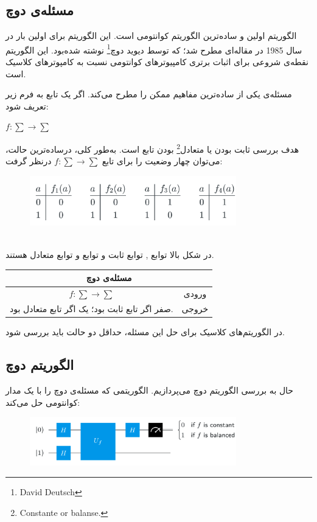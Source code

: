 \documentclass{book}
\begin{document}
\subsection{مسئله‌ی دوچ}
الگوریتم  اولین و ساده‌ترین الگوریتم کوانتومی‌ است. این الگوریتم برای اولین بار در سال 1985 در مقاله‌ای مطرح شد؛ که توسط دیوید دوچ\footnote{David Deutsch} نوشته شده‌‌بود. این الگوریتم نقطه‌ی شروعی برای اثبات برتری کامپیوترهای کوانتومی نسبت به کامپوترهای کلاسیک است.

مسئله‌ی  یکی از ساده‌ترین مفاهیم ممکن را مطرح می‌کند. اگر یک تابع به فرم زیر تعریف شود: 
\begin{center}
	$f : \sum \rightarrow \sum$
\end{center}
هدف بررسی ثابت بودن یا متعادل\footnote{Constante or balanse.} بودن تابع  است. 
به‌طور کلی، درساده‌ترین حالت، می‌توان چهار وضعیت را برای تابع $f : \sum \rightarrow \sum$ درنظر گرفت:\\
\begin{figure}[ht]
	\centering
	\includegraphics[width=0.8\textwidth]{Constantorbalanse.png}
	\caption{}
\end{figure}\\
در شکل بالا توابع  ,  توابع ثابت و توابع  و  توابع متعادل هستند.
\begin{center}
\begin{tabular}{|c|c|}
	\hline
	\multicolumn{2}{|c|}{مسئله‌ی دوچ} \\
	\hline
	$f : \sum \rightarrow \sum$ & ورودی \\
	\hline
	صفر اگر تابع ثابت بود؛ یک اگر تابع متعادل بود.  & خروجی \\
	\hline
\end{tabular}
\end{center}
در الگوریتم‌های کلاسیک برای حل این مسئله، حداقل دو حالت باید بررسی شود.
\subsection{الگوریتم دوچ}

حال به بررسی الگوریتم دوچ می‌پردازیم. الگوریتمی که مسئله‌ی دوچ را با یک مدار کوانتومی حل می‌کند:\\
\begin{center}
\begin{figure}[ht]
	\centering
	\includegraphics[width=0.8\textwidth]{Deutsch algorithm.png}
	\caption{}
\end{figure}
\end{center}
\end{document}
